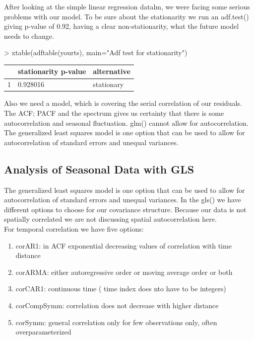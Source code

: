 \documentclass[10pt, a4paper]{article} %
\begin{document}
After looking at the simple linear regression datalm, we were facing some serious problems with our model. To be sure about the stationarity we run an adf.test() giving p-value of 0.92, having a clear non-stationarity, what the future model needs to change. 

\begin{Schunk}
\begin{Sinput}
> xtable(adftable(yourts), main="Adf test for stationarity")
\end{Sinput}
\end{Schunk}

\begin{table}[ht]
\centering
\begin{tabular}{rll}
\hline
& stationarity p-value & alternative \\
\hline
1 & 0.928016 & stationary \\
\hline
\end{tabular}
\end{table}

Also we need a model, which is covering the serial correlation of our residuals. The ACF; PACF and the spectrum gives us certainty that there is some autocorrelation and seasonal fluctuation. glm() cannot allow for autocorrelation. The generalized least squares  model is one option that can be used to allow for autocorrelation of standard errors and unequal variances. 


\subsection{Analysis of Seasonal Data with GLS}

The generalized least squares  model is one option that can be used to allow for autocorrelation of standard errors and unequal variances. In the gls() we have different options to choose for our covariance structure. Because our data is not spatially correlated we are not discussing spatial autocorrelation here.\\

For temporal correlation we have five options:
\begin{enumerate}
\item corAR1: in ACF exponential decreasing values of correlation with time distance\\
\item corARMA: either autoregressive order or moving average order or both\\
\item corCAR1: continuous time ( time index does nto have to be integers)\\
\item corCompSymm: correlation does not decrease with higher distance\\
\item corSymm: general correlation only for few observations only, often overparameterized\\
\end{enumerate}
\end{document}

